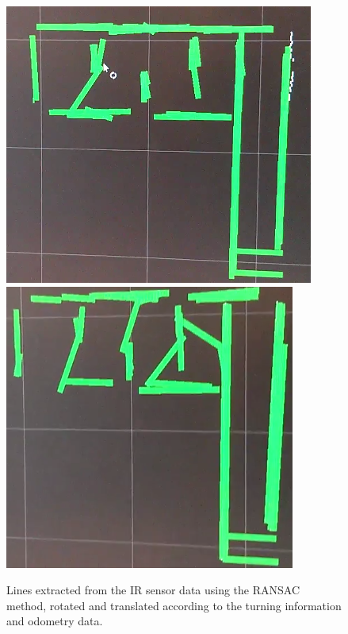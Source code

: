 \documentclass[10pt,a4paper,twocolumn]{article}
\begin{document}
\begin{figure}
  \centering
  \includegraphics[width=\linewidth]{images/segmap.png}
  \includegraphics[width=\linewidth]{images/segmap2.png}
  \caption{Lines extracted from the IR sensor data using the RANSAC method,
    rotated and translated according to the turning information and odometry
    data. }
  \label{fig:rsacline}
\end{figure}
\end{document}
